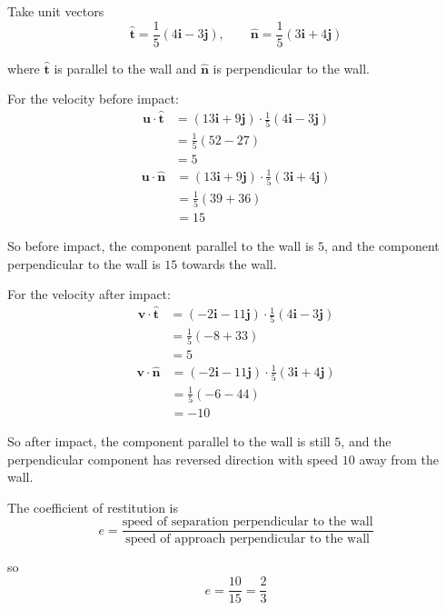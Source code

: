 \documentclass[leqno]{article}
\begin{document}
\begin{enumerate}[
  label=\textbf{\arabic*.},
  leftmargin=*,
  topsep=0pt,
  partopsep=0pt,
  parsep=0pt
]
\begin{djsSolution}
\begin{enumerate}[label=\textbf{(\alph*)}]
  Take unit vectors
  \[
  \hat{\mathbf{t}}=\frac{1}{5}(4\mathbf{i}-3\mathbf{j}),
  \qquad
  \hat{\mathbf{n}}=\frac{1}{5}(3\mathbf{i}+4\mathbf{j})
  \]

  where $\hat{\mathbf{t}}$ is parallel to the wall and $\hat{\mathbf{n}}$ is perpendicular to the wall.

  For the velocity before impact:
  \begin{align*}
  \mathbf{u}\cdot\hat{\mathbf{t}}
  &= (13\mathbf{i}+9\mathbf{j})\cdot \frac{1}{5}(4\mathbf{i}-3\mathbf{j}) \\
  &= \frac{1}{5}(52-27) \\
  &= 5
  \end{align*}
  \begin{align*}
  \mathbf{u}\cdot\hat{\mathbf{n}}
  &= (13\mathbf{i}+9\mathbf{j})\cdot \frac{1}{5}(3\mathbf{i}+4\mathbf{j}) \\
  &= \frac{1}{5}(39+36) \\
  &= 15
  \end{align*}

  So before impact, the component parallel to the wall is $5$, and the component perpendicular to the wall is $15$ towards the wall.

  For the velocity after impact:
  \begin{align*}
  \mathbf{v}\cdot\hat{\mathbf{t}}
  &= (-2\mathbf{i}-11\mathbf{j})\cdot \frac{1}{5}(4\mathbf{i}-3\mathbf{j}) \\
  &= \frac{1}{5}(-8+33) \\
  &= 5
  \end{align*}
  \begin{align*}
  \mathbf{v}\cdot\hat{\mathbf{n}}
  &= (-2\mathbf{i}-11\mathbf{j})\cdot \frac{1}{5}(3\mathbf{i}+4\mathbf{j}) \\
  &= \frac{1}{5}(-6-44) \\
  &= -10
  \end{align*}

  So after impact, the component parallel to the wall is still $5$, and the perpendicular component has reversed direction with speed $10$ away from the wall.

  The coefficient of restitution is
  \[
  e=\dfrac{\text{speed of separation perpendicular to the wall}}{\text{speed of approach perpendicular to the wall}}
  \]

  so
  \[
  e=\frac{10}{15}=\frac{2}{3}
  \]

\end{enumerate}
\end{djsSolution}



\end{enumerate}
\end{document}
